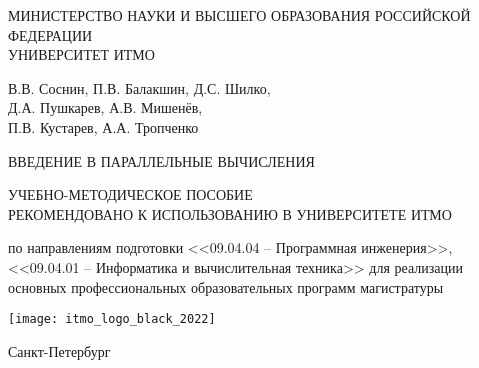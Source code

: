 \thispagestyle{empty}

\begin{center}
    \noindent МИНИСТЕРСТВО НАУКИ И ВЫСШЕГО ОБРАЗОВАНИЯ РОССИЙСКОЙ ФЕДЕРАЦИИ
    \\[\baselineskip]
    УНИВЕРСИТЕТ ИТМО
    \\[2\baselineskip]
    \begin{bfseries}
        \begin{Large}
            В.В. Соснин, П.В. Балакшин, Д.С. Шилко, \\
            Д.А. Пушкарев, А.В. Мишенёв, \\
            П.В. Кустарев, А.А. Тропченко 
            \\[\baselineskip]
            \centerline{ВВЕДЕНИЕ В ПАРАЛЛЕЛЬНЫЕ ВЫЧИСЛЕНИЯ}
        \end{Large}
    \end{bfseries}
    
    \bigskip
    
    УЧЕБНО-МЕТОДИЧЕСКОЕ ПОСОБИЕ
    \\[\baselineskip]
    РЕКОМЕНДОВАНО К ИСПОЛЬЗОВАНИЮ В УНИВЕРСИТЕТЕ ИТМО
        
    по направлениям подготовки <<09.04.04 -- Программная инженерия>>, <<09.04.01 -- Информатика и вычислительная техника>> для реализации основных профессиональных образовательных программ магистратуры

    \vspace{\fill}

    \texttt{[image: itmo\_logo\_black\_2022]}

    \bigskip

    \begin{bfseries}
        \begin{large}
            Санкт-Петербург \\ 
            \the\year
        \end{large}
    \end{bfseries}
    
\end{center}

        
